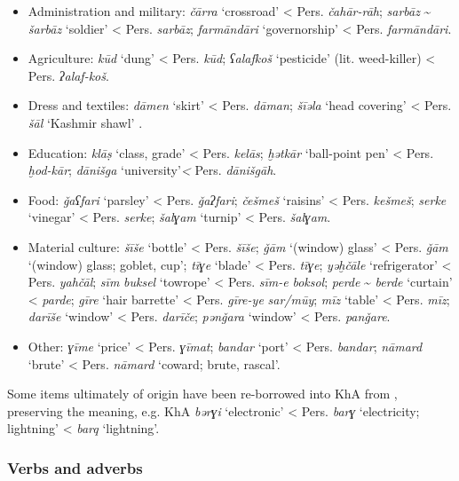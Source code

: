 \documentclass[output=paper,nonflat]{langsci/langscibook}
\begin{document}
\begin{itemize} 
\item[] Administration and military: \textit{čārra} ‘crossroad’ < Pers. \textit{čahār-rāh}; \textit{sarbāz} \~{} \textit{šarbāz} ‘soldier’ < Pers. \textit{sarbāz}; \textit{farmāndāri} ‘governorship’ < Pers. \textit{farmān\-dāri}.
\item[] Agriculture: \textit{kūd} ‘dung’ < Pers. \textit{kūd}; \textit{ʕalafkoš} ‘pesticide' (lit. weed-killer) < Pers. \textit{ʔalaf-koš}. 
\item[] Dress and textiles: \textit{dāmen} ‘skirt’ < Pers. \textit{dāman}; \textit{šīəla} ‘head covering’ < Pers. \textit{šāl} ‘Kashmir shawl’ \citep[174]{Ingham2005}.
\item[] Education:  \textit{klāṣ} ‘class, grade’ < Pers. \textit{kelās}; \textit{ḫətkār} ‘ball-point pen’ < Pers. \textit{ḫod-kār}; \textit{dānišga} ‘university’\textit{<} Pers. \textit{dānišgāh}.
\item[] Food: \textit{ǧaʕfari} ‘parsley’ < Pers. \textit{ǧaʔfari}; \textit{češmeš} ‘raisins’ < Pers. \textit{kešmeš}; \textit{serke} ‘vinegar’ < Pers. \textit{serke}; \textit{šalɣam} ‘turnip’ < Pers. \textit{šalɣam}.
\item[] Material culture: \textit{šīše} ‘bottle’ < Pers. \textit{šīše}; \textit{ǧām} ‘(window) glass’ < Pers. \textit{ǧām} ‘(window) glass; goblet, cup'; \textit{tīɣe} ‘blade’ < Pers. \textit{tīɣe}; \textit{yəḫčāle} ‘refrigerator’ < Pers. \textit{yahčāl}; \textit{sīm} \textit{buksel} ‘towrope’ < Pers. \textit{sīm-e} \textit{boksol}; \textit{perde} \~{} \textit{berde} ‘curtain’ < \textit{parde}; \textit{gīre} ‘hair barrette’ < Pers. \textit{gīre-ye} \textit{sar/mūy}; \textit{mīz} ‘table’ < Pers. \textit{mīz}; \textit{darīše} ‘window’ < Pers. \textit{darīče}; \textit{pənǧara} ‘window’ < Pers. \textit{panǧare}.
\item[] Other: \textit{ɣīme} ‘price’ < Pers. \textit{ɣīmat}; \textit{bandar} ‘port’ < Pers. \textit{bandar}; \textit{nāmard} ‘brute’ < Pers. \textit{nāmard} `coward; brute, rascal'.
\end{itemize}

Some items ultimately of  origin have been re-borrowed into KhA from , preserving the  meaning, e.g. KhA \textit{bərɣi} ‘electronic’ < Pers. \textit{barɣ} ‘electricity; lightning’ <  \textit{barq} ‘lightning’. 


\subsubsection{Verbs and adverbs} 
\end{document}
